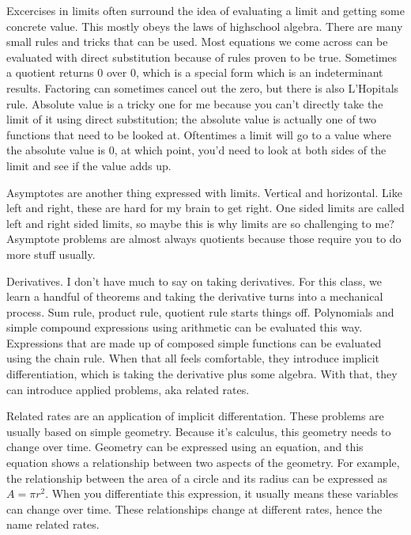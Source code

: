 Excercises in limits often surround the idea of evaluating a limit and getting some concrete value. This mostly obeys the laws of highschool algebra. There are many small rules and tricks that can be used. Most equations we come across can be evaluated with direct substitution because of rules proven to be true. Sometimes a quotient returns 0 over 0, which is a special form which is an indeterminant results. Factoring can sometimes cancel out the zero, but there is also L'Hopitals rule. Absolute value is a tricky one for me because you can't directly take the limit of it using direct substitution; the absolute value is actually one of two functions that need to be looked at. Oftentimes a limit will go to a value where the absolute value is 0, at which point, you'd need to look at both sides of the limit and see if the value adds up.
\par

Asymptotes are another thing expressed with limits. Vertical and horizontal. Like left and right, these are hard for my brain to get right. One sided limits are called left and right sided limits, so maybe this is why limits are so challenging to me? Asymptote problems are almost always quotients because those require you to do more stuff usually.
\par

Derivatives. I don't have much to say on taking derivatives. For this class, we learn a handful of theorems and taking the derivative turns into a mechanical process. Sum rule, product rule, quotient rule starts things off. Polynomials and simple compound expressions using arithmetic can be evaluated this way.  Expressions that are made up of composed simple functions can be evaluated using the chain rule. When that all feels comfortable, they introduce implicit differentiation, which is taking the derivative plus some algebra. With that, they can introduce applied problems, aka related rates.
\par

Related rates are an application of implicit differentation. These problems are usually based on simple geometry. Because it's calculus, this geometry needs to change over time. Geometry can be expressed using an equation, and this equation shows a relationship between two aspects of the geometry. For example, the relationship between the area of a circle and its radius can be expressed as $A=\pi r^2$. When you differentiate this expression, it usually means these variables can change over time. These relationships change at different rates, hence the name related rates.
\par

